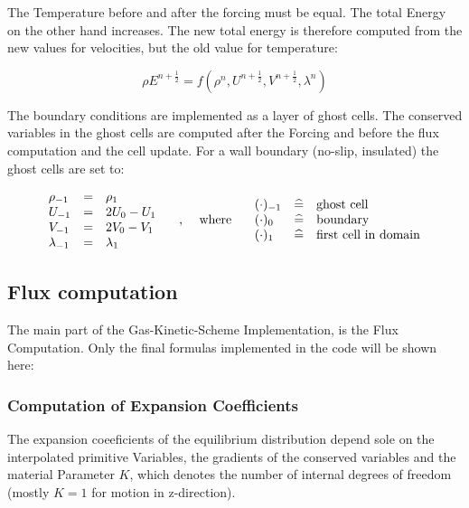 \documentclass[
	pdftex,             %
	12pt,				%
	a4paper,		   	%
	english,				%
	oneside,			%
]{article}
\begin{document}
The Temperature before and after the forcing must be equal. The total Energy on the other hand increases. The new total energy is therefore computed from the new values for velocities, but the old value for temperature:

\begin{equation}
\rho E^{n+\frac{1}{2}} = f(\rho^n, U^{n+\frac{1}{2}}, V^{n+\frac{1}{2}}, \lambda^n)
\end{equation}

The boundary conditions are implemented as a layer of ghost cells. The conserved variables in the ghost cells are computed after the Forcing and before the flux computation and the cell update. For a wall boundary (no-slip, insulated) the ghost cells are set to:

\begin{equation}
\begin{array}{lcl}
\rho_{-1} &=& \rho_{1} \\
U_{-1} &=& 2 U_{0} - U_{1} \\
V_{-1} &=& 2 V_{0} - V_{1} \\
\lambda_{-1} &=& \lambda_{1}
\end{array}
\textnormal{~~~~,~~~~where~~~~}
\begin{array}{lcl}
(\cdot)_{-1} &\widehat{=}& \textnormal{ghost cell} \\
(\cdot)_0 &\widehat{=}& \textnormal{boundary} \\
(\cdot)_1 &\widehat{=}& \textnormal{first cell in domain}
\end{array}
\end{equation}

\subsection{Flux computation}

The main part of the Gas-Kinetic-Scheme Implementation, is the Flux Computation. Only the final formulas implemented in the code will be shown here:

\subsubsection{Computation of Expansion Coefficients}

The expansion coeeficients of the equilibrium distribution depend sole on the interpolated primitive Variables, the gradients of the conserved variables and the material Parameter $K$, which denotes the number of internal degrees of freedom (mostly $K=1$ for motion in z-direction). 
\end{document}
